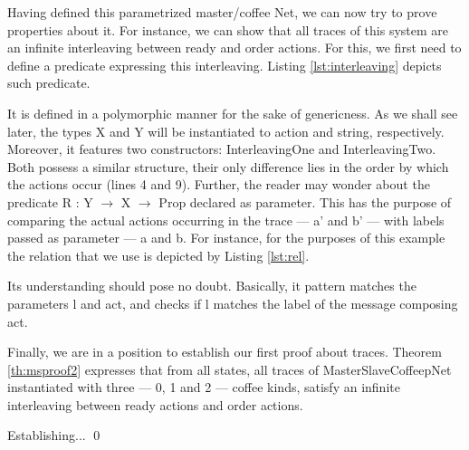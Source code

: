 	\noindent Having defined this parametrized master/coffee \textsf{Net}, we can
	now try to prove properties about it. For instance, we can show that all traces
	of this system are an infinite interleaving between \textsf{ready} and \textsf{order}
	\textsf{actions}. For this, we first need to define a predicate expressing
	this interleaving. Listing \ref{lst:interleaving} depicts such predicate.

					

	\noindent It is defined in a polymorphic manner for the sake of genericness.
	As we shall see later, the types \textsf{X} and \textsf{Y} will be instantiated to
	\textsf{action} and \textsf{string}, respectively.			
	Moreover, it features two constructors: \textsf{InterleavingOne} and \textsf{InterleavingTwo}.
	Both possess a similar structure, their only difference lies in the order
	by which the \textsf{actions} occur (lines 4 and 9). Further, the reader may wonder about
	the predicate \textsf{R : Y $\rightarrow$ X $\rightarrow$ Prop} declared as parameter.
	This has the purpose of comparing the actual \textsf{actions} occurring in the
	trace --- \textsf{a'} and \textsf{b'} --- with labels passed as parameter --- \textsf{a} and \textsf{b}. 
	For instance, for the purposes of this example the relation that we use is depicted by Listing \ref{lst:rel}.	
	
				

	\noindent Its understanding should pose no doubt. Basically, it pattern matches
	the parameters \textsf{l} and \textsf{act}, and checks if \textsf{l} matches 
	the label of the \textsf{message} composing \textsf{act}.
	
	Finally, we are in a position to establish our first proof about traces. Theorem
	\ref{th:msproof2} expresses that from all states, all traces of \textsf{MasterSlaveCoffeepNet} instantiated with three --- 0, 1 and 2 ---
	coffee kinds, satisfy an infinite interleaving between \textsf{ready} \textsf{actions} and \textsf{order}
	\textsf{actions}.
	

\begin{theorem} \label{th:msproof2} 
			
		Establishing... \qed
\end{theorem}


